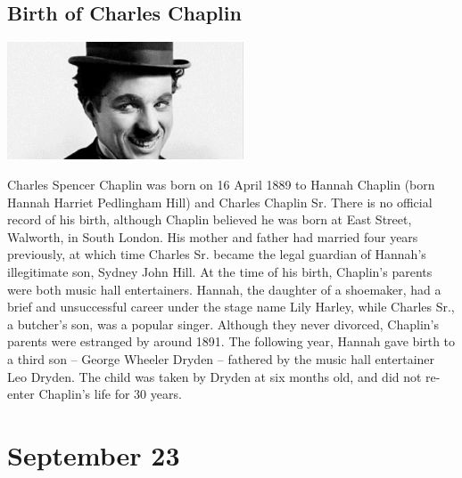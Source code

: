 \documentclass[11pt]{report}
\begin{document}
\subsection{Birth of Charles Chaplin}
\vspace{2mm}\begin{center}\includegraphics[width=7cm]{./img/charlieChaplin.jpg}\end{center}
Charles Spencer Chaplin was born on 16 April 1889 to Hannah Chaplin (born Hannah Harriet Pedlingham Hill) and Charles Chaplin Sr. There is no official record of his birth, although Chaplin believed he was born at East Street, Walworth, in South London. His mother and father had married four years previously, at which time Charles Sr. became the legal guardian of Hannah's illegitimate son, Sydney John Hill. At the time of his birth, Chaplin's parents were both music hall entertainers. Hannah, the daughter of a shoemaker, had a brief and unsuccessful career under the stage name Lily Harley, while Charles Sr., a butcher's son, was a popular singer. Although they never divorced, Chaplin's parents were estranged by around 1891. The following year, Hannah gave birth to a third son – George Wheeler Dryden – fathered by the music hall entertainer Leo Dryden. The child was taken by Dryden at six months old, and did not re-enter Chaplin's life for 30 years.

\section{September 23}
\end{document}
